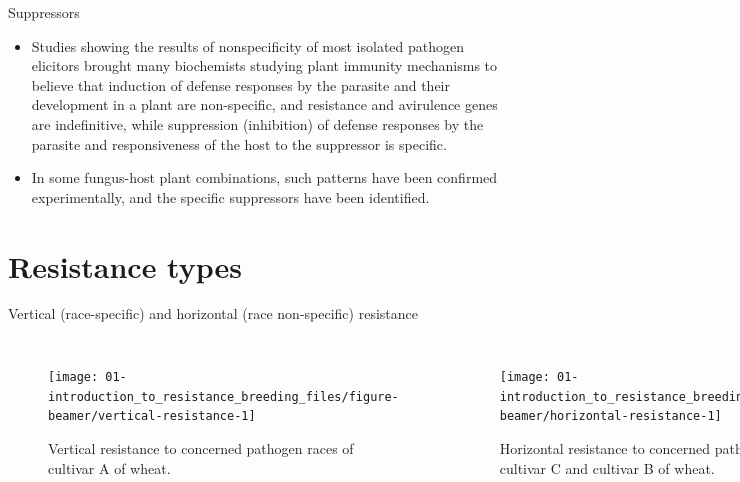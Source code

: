 \documentclass[11pt,dvipsnames,ignorenonframetext,aspectratio=169]{beamer}
\providecommand{\tightlist}{%
  \setlength{\itemsep}{0pt}\setlength{\parskip}{0pt}}
\begin{document}
\begin{frame}{Suppressors}
\protect\hypertarget{suppressors}{}
\small

\begin{itemize}
\tightlist
\item
  Studies showing the results of nonspecificity of most isolated
  pathogen elicitors brought many biochemists studying plant immunity
  mechanisms to believe that induction of defense responses by the
  parasite and their development in a plant are non-specific, and
  resistance and avirulence genes are indefinitive, while suppression
  (inhibition) of defense responses by the parasite and responsiveness
  of the host to the \alert{suppressor} is specific.
\item
  In some fungus-host plant combinations, such patterns have been
  confirmed experimentally, and the specific suppressors have been
  identified.
\end{itemize}
\end{frame}

\hypertarget{resistance-types}{%
\section{Resistance types}\label{resistance-types}}

\begin{frame}{Vertical (race-specific) and horizontal (race
non-specific) resistance}
\protect\hypertarget{vertical-race-specific-and-horizontal-race-non-specific-resistance}{}
\begin{columns}[T, onlytextwidth]

\begin{figure}
\texttt{[image: 01-introduction\_to\_resistance\_breeding\_files/figure-beamer/vertical-resistance-1]} \caption{Vertical resistance to concerned pathogen races of cultivar A of wheat.}\label{fig:vertical-resistance}
\end{figure}


\begin{figure}
\texttt{[image: 01-introduction\_to\_resistance\_breeding\_files/figure-beamer/horizontal-resistance-1]} \caption{Horizontal resistance to concerned pathogen races of cultivar C and cultivar B of wheat.}\label{fig:horizontal-resistance}
\end{figure}

\end{columns}
\end{frame}
\end{document}
